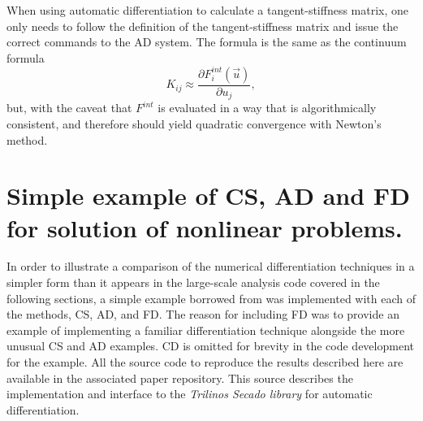 \documentclass[preprint,12pt]{elsarticle}
\begin{document}
When using automatic differentiation to calculate a tangent-stiffness matrix, one only needs to follow the definition of the tangent-stiffness matrix and issue the correct commands to the AD system. The formula is the same as the continuum formula
%
\begin{equation} K_{ij} \approx \frac{\partial F_i^{int}(\vec{u})}{\partial u_j},
\end{equation}
%
but, with the caveat that $F^{int}$ is evaluated in a way that is algorithmically consistent, and therefore should yield quadratic convergence with Newton's method.

\section{Simple example of CS, AD and FD for solution of nonlinear problems.}
\label{sec:Validation}

In order to illustrate a comparison of the numerical differentiation techniques in a simpler form than it appears in the large-scale analysis code covered in the following sections, a simple example borrowed from \cite{rezaiee2010dynamic} was implemented with each of the methods, CS, AD, and FD. The reason for including FD was to provide an example of implementing a familiar differentiation technique alongside the more unusual CS and AD examples. CD is omitted for brevity in the code development for the example. All the source code to reproduce the results described here are available in the associated paper repository. This source describes the implementation and interface to the \emph{Trilinos Secado library} for automatic differentiation.
\end{document}
